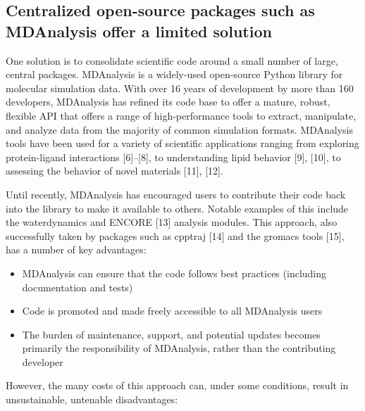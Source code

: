 \documentclass{article}
\begin{document}
\subsection{Centralized open-source packages such as MDAnalysis offer a limited solution}

One solution is to consolidate scientific code around a small number of large, central packages. MDAnalysis is a widely-used open-source Python library for molecular simulation data. With over 16 years of development by more than 160 developers, MDAnalysis has refined its code base to offer a mature, robust, flexible API that offers a range of high-performance tools to extract, manipulate, and analyze data from the majority of common simulation formats. MDAnalysis tools have been used for a variety of scientific applications ranging from exploring protein-ligand interactions [6]–[8], to understanding lipid behavior [9], [10], to assessing the behavior of novel materials [11], [12]. 

Until recently, MDAnalysis has encouraged users to contribute their code back into the library to make it available to others. Notable examples of this include the waterdynamics and ENCORE [13] analysis modules. This approach, also successfully taken by packages such as cpptraj [14] and the gromacs tools [15], has a number of key advantages:
\begin{itemize}
    \item MDAnalysis can ensure that the code follows best practices (including documentation and tests)
    \item Code is promoted and made freely accessible to all MDAnalysis users
    \item The burden of maintenance, support, and potential updates becomes primarily the responsibility of MDAnalysis, rather than the contributing developer
\end{itemize}

However, the many costs of this approach can, under some conditions, result in unsustainable, untenable disadvantages:
\end{document}
